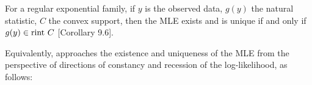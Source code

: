 

\begin{theorem}
For a regular exponential family, if $y$ is the observed data, $g(y)$ the natural statistic, $C$ the convex support, then the MLE exists and is unique if and only
if $g(y) \in \operatorname{rint} \, C$ \citep{Barndorff}[Corollary 9.6].
\end{theorem}
Equivalently, \citet{Geyer:gdor} approaches the existence and uniqueness of the MLE from the perspective of directions of constancy and recession of the log-likelihood, as follows:


